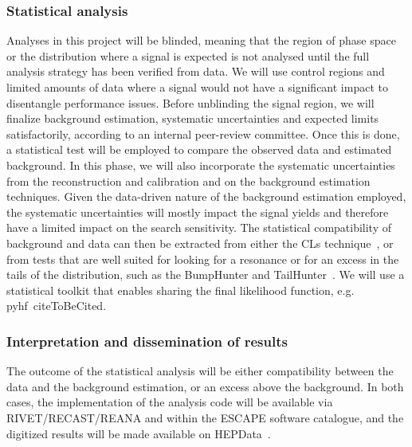 \subsubsection{Statistical analysis} Analyses in this project will be blinded, meaning that the region of phase space or the distribution where a signal is expected is not analysed until the full analysis strategy has been verified from data. We will use control regions and limited amounts of data where a signal would not have a significant impact to disentangle performance issues. 
Before unblinding the signal region, we will finalize background estimation, systematic uncertainties and expected limits satisfactorily, according to an internal peer-review committee. 
Once this is done, a statistical test will be employed to compare the observed data and estimated background. In this phase, we will also incorporate the systematic uncertainties from the reconstruction and calibration and on the background estimation techniques. 
Given the data-driven nature of the background estimation employed, the systematic uncertainties will mostly impact the signal yields and therefore have a limited impact on the search sensitivity. 
The statistical compatibility of background and data can then be extracted from either the CLs technique~\cite{ToBeCited}, %
or from tests that are well suited for looking for a resonance or for an excess in the tails of the distribution, such as the BumpHunter and TailHunter~\cite{ToBeCited}. %
We will use a statistical toolkit that enables sharing the final likelihood function, e.g. pyhf~cite{ToBeCited}. %

\subsubsection{Interpretation and dissemination of results} The outcome of the statistical analysis will be either compatibility between the data and the background estimation, or an excess above the background. In both cases, the implementation of the analysis code will be available via RIVET/RECAST/REANA and within the ESCAPE software catalogue, and the digitized results will be made available on HEPData~\cite{ToBeCited}. %

